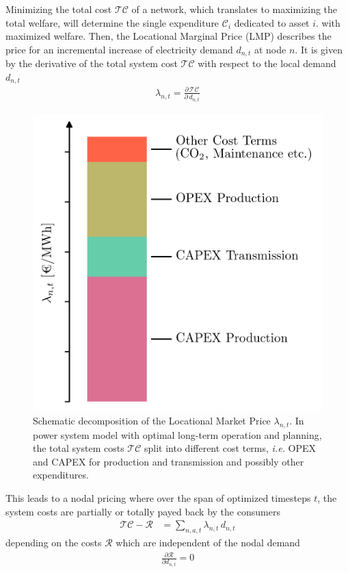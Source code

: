 \documentclass[11pt,twocolumn]{article}
\newcommand{\ie}{\textit{i.e.} }
\newcommand{\pdv}[2]{\frac{\partial #1}{\partial #2}}
\newcommand{\demand}[1][n]{d_{#1,t}}
\newcommand{\lmp}[1][n]{\lambda_{#1,t}}
\newcommand{\totalcost}{\mathcal{TC}}
\newcommand{\cost}{\mathcal{C}}
\newcommand{\remainingcost}{\mathcal{R}}
\begin{document}
Minimizing the total cost $\totalcost$  of a network, which translates to maximizing the total welfare, will determine the single expenditure $\cost_i$ dedicated to asset $i$.  with maximized welfare. Then, the Locational Marginal Price (LMP) describes the price for an incremental increase of electricity demand $\demand$ at node $n$. It is given by the derivative of the total system cost $\totalcost$ with respect to the local demand $\demand$
\begin{align}
\lmp = \pdv{\,\totalcost}{\,\demand}
\label{eq:total_cost_derivative}
\end{align}
% 
\begin{figure}[h]
\centering
\includegraphics[width=.8\linewidth]{price_decomposition.png}
\caption{Schematic decomposition of the Locational Market Price $\lmp$. In power system model with optimal long-term operation and planning, the total system costs $\totalcost$ split into different cost terms, \ie OPEX and CAPEX for production and transmission and possibly other expenditures. }
\label{fig:price_decomposition}
\end{figure}
% 
This leads to a nodal pricing where over the span of optimized timesteps $t$, the system costs are partially or totally payed back by the consumers 
\begin{align}
\totalcost - \remainingcost &=  \sum_{n,a,t} \lmp \, \demand
\label{eq:total_cost_sum}
\end{align}
depending on the costs $\remainingcost$ which are independent of the nodal demand  
\begin{align}
 \pdv{\remainingcost}{\demand} = 0
\end{align}
\end{document}
